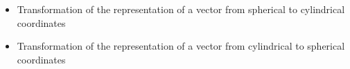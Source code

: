 \begin{ELjoin}

\begin{itemize}
\tightlist
\item
  Transformation of the representation of a vector from spherical to cylindrical coordinates
\end{itemize}

\begin{ELimportant}{}


\end{ELimportant}

\end{ELjoin}

\begin{ELjoin}

\begin{itemize}
\tightlist
\item
  Transformation of the representation of a vector from cylindrical to spherical coordinates
\end{itemize}

\begin{ELimportant}{}


\end{ELimportant}

\end{ELjoin}

